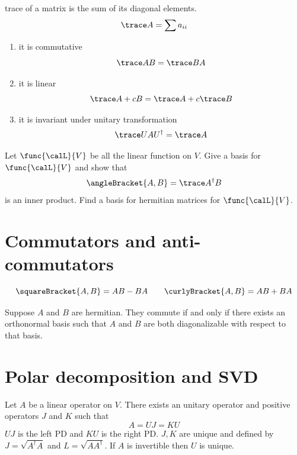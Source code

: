 trace of a matrix is the sum of its diagonal elements. 
\begin{equation*}
    \trace A = \sum a_{ii}
\end{equation*}
\begin{proposition}
    \begin{enumerate}
        \item it is commutative 
        \begin{equation*}
            \trace AB =  \trace BA
        \end{equation*}
        \item it is linear 
        \begin{equation*}
            \trace A + cB = \trace A + c \trace B
        \end{equation*}
        \item it is invariant under unitary transformation
        \begin{equation*}
            \trace U A U^{\dagger} = \trace A
        \end{equation*}
    \end{enumerate}
\end{proposition}

\begin{proposition}
    Let \(\func{\calL}{V}\) be all the linear function on \(V\). Give a basis for \(\func{\calL}{V}\) and show that 
    \begin{equation*}
        \angleBracket{A,B} = \trace A^{\dagger}B
    \end{equation*}
    is an inner product. Find a basis for hermitian matrices for \(\func{\calL}{V}\).
\end{proposition}

\section{Commutators and anti-commutators}
\begin{equation*}
    \squareBracket{A,B} = AB - BA  \qquad \curlyBracket{A,B} = AB + BA
\end{equation*}
\begin{theorem} Suppose \(A\) and \(B\) are hermitian. They commute if and only if there exists an orthonormal basis such that \(A\) and \(B\) are both diagonalizable with respect to that basis.
\end{theorem}

\section{Polar decomposition and SVD}
\begin{theorem}
    Let \(A\) be a linear operator on \(V\). There exists an unitary operator and positive operators \(J\) and \(K\) such that 
    \begin{equation*}
        A = UJ = KU
    \end{equation*}
    \(UJ\) is the left PD and \(KU\) is the right PD. \(J,K\) are unique and defined by \(J = \sqrt{A^{\dagger }A}\) and \(L = \sqrt{AA^{\dagger}}\). If \(A\) is invertible then \(U\) is unique. 
\end{theorem}

